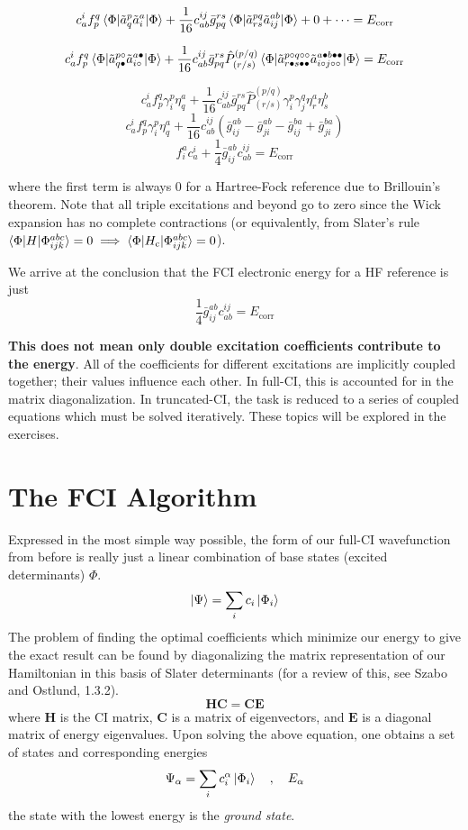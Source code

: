 \documentclass{article}
\newcommand{\lp}{\left(}
\newcommand{\rp}{\right)}
\newcommand{\h}{\circ}
\newcommand{\p}{\bullet}
\newcommand{\Ecorr}{E_{\mathrm{corr}}}
\newcommand{\Hc}{H_{\mathrm{c}}}
\begin{document}
\[ c_a^i f_p^q \braket{\Phi| \tilde{a}_{q}^{p} \tilde{a}_{i}^{a} |\Phi} + \frac{1}{16} c_{ab}^{ij} \bar{g}_{pq}^{rs} \braket{\Phi| \tilde{a}_{rs}^{pq} \tilde{a}_{ij}^{ab} | \Phi} + 0 + \cdots = \Ecorr \]

\[ c_a^i f_p^q \braket{\Phi| \tilde{a}_{q \p}^{p \h} \tilde{a}_{i \h}^{a \p} |\Phi} + 
   \frac{1}{16} c_{ab}^{ij} \bar{g}_{pq}^{rs} \hat{P}_{(r/s)}^{(p/q)} \braket{\Phi| \tilde{a}_{r \p s \p \p}^{p \h q \h \h} \tilde{a}_{i \h j \h \h}^{a \p b \p \p} | \Phi} = \Ecorr \]

\[ c_a^i f_p^q \gamma^{p}_{i} \eta_{q}^{a} + \frac{1}{16} c_{ab}^{ij} \bar{g}_{pq}^{rs} \hat{P}_{(r/s)}^{(p/q)} \gamma_i^p \gamma_j^q \eta_r^a \eta_s^b \]
\[ c_a^i f_p^q \gamma^{p}_{i} \eta_{q}^{a} + \frac{1}{16} c_{ab}^{ij}  \lp \bar{g}_{ij}^{ab} - \bar{g}_{ji}^{ab} - \bar{g}_{ij}^{ba} + \bar{g}_{ji}^{ba}  \rp\]
\[ f_i^a c_a^i + \frac{1}{4} \bar{g}_{ij}^{ab} c_{ab}^{ij} = \Ecorr \]

where the first term is always 0 for a Hartree-Fock reference due to Brillouin's theorem. 
Note that all triple excitations and beyond go to zero since the Wick expansion has no complete contractions 
(or equivalently, from Slater's rule $\braket{\Phi | H | \Phi_{ijk}^{abc}} = 0  \implies \braket{\Phi | \Hc | \Phi_{ijk}^{abc}} = 0 $).

We arrive at the conclusion that the FCI electronic energy for a HF reference is just
\[ \frac{1}{4} \bar{g}_{ij}^{ab} c_{ab}^{ij} = \Ecorr \]

\textbf{This does not mean only double excitation coefficients contribute to the energy}.
All of the coefficients for different excitations are implicitly coupled together; their values influence each other. 
In full-CI, this is accounted for in the matrix diagonalization.
In truncated-CI, the task is reduced to a series of coupled equations which must be solved iteratively. 
These topics will be explored in the exercises.

\section{The FCI Algorithm} 
Expressed in the most simple way possible, the form of our full-CI wavefunction from before is really
just a linear combination of base states (excited determinants) $\Phi$.
\[ \ket{\Psi} = \sum_i c_i \ket{\Phi_i} \]
The problem of finding the optimal coefficients which minimize our energy to give the exact result can be found by diagonalizing the 
matrix representation of our Hamiltonian in this basis of Slater determinants (for a review of this, see Szabo and Ostlund, 1.3.2).
\[\mathbf{HC} = \mathbf{CE}\]
where  $\mathbf{H}$ is the CI matrix, $\mathbf{C}$ is a matrix of eigenvectors, and $\mathbf{E}$ is a diagonal matrix of energy eigenvalues.
Upon solving the above equation, one obtains a set of states and corresponding energies
\[ \Psi_\alpha = \sum_i c_i^\alpha \ket{\Phi_i} \quad , \quad E_\alpha \]
the state with the lowest energy is the \textit{ground state}.
\end{document}
